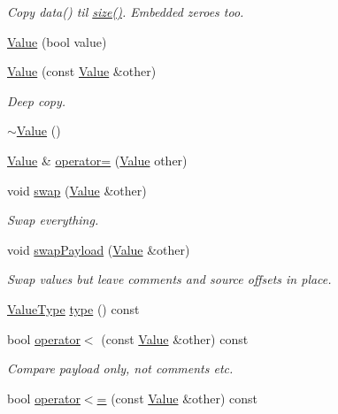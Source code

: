 \begin{DoxyCompactItemize}
\begin{DoxyCompactList}\small\item\em Copy data() til \hyperlink{class_json_1_1_value_a0ec2808e1d7efa4e9fad938d6667be44}{size()}. Embedded zeroes too. \end{DoxyCompactList}\item 
\hyperlink{class_json_1_1_value_a350a31ea4a30d384994b0bc010b17495}{Value} (bool value)
\item 
\hyperlink{class_json_1_1_value_a436dfd3670f95fd665f680eba5cebcf0}{Value} (const \hyperlink{class_json_1_1_value}{Value} \&other)
\begin{DoxyCompactList}\small\item\em Deep copy. \end{DoxyCompactList}\item 
\hyperlink{class_json_1_1_value_a287dea48da3912d02756735bf677b27b}{$\sim$\+Value} ()
\item 
\hyperlink{class_json_1_1_value}{Value} \& \hyperlink{class_json_1_1_value_a94ca5ba1f5e152d8ad280b1b54796fdc}{operator=} (\hyperlink{class_json_1_1_value}{Value} other)
\item 
void \hyperlink{class_json_1_1_value_aab841120d78e296e1bc06a373345e822}{swap} (\hyperlink{class_json_1_1_value}{Value} \&other)
\begin{DoxyCompactList}\small\item\em Swap everything. \end{DoxyCompactList}\item 
void \hyperlink{class_json_1_1_value_a5263476047f20e2fc6de470e4de34fe5}{swap\+Payload} (\hyperlink{class_json_1_1_value}{Value} \&other)
\begin{DoxyCompactList}\small\item\em Swap values but leave comments and source offsets in place. \end{DoxyCompactList}\item 
\hyperlink{namespace_json_a7d654b75c16a57007925868e38212b4e}{Value\+Type} \hyperlink{class_json_1_1_value_a8ce61157a011894f0252ceed232312de}{type} () const
\item 
bool \hyperlink{class_json_1_1_value_aac6bd14155b88ed2d39ef54820b39e49}{operator$<$} (const \hyperlink{class_json_1_1_value}{Value} \&other) const
\begin{DoxyCompactList}\small\item\em Compare payload only, not comments etc. \end{DoxyCompactList}\item 
bool \hyperlink{class_json_1_1_value_a40c411a320a416d5eac0052b36211286}{operator$<$=} (const \hyperlink{class_json_1_1_value}{Value} \&other) const

\end{DoxyCompactItemize}

